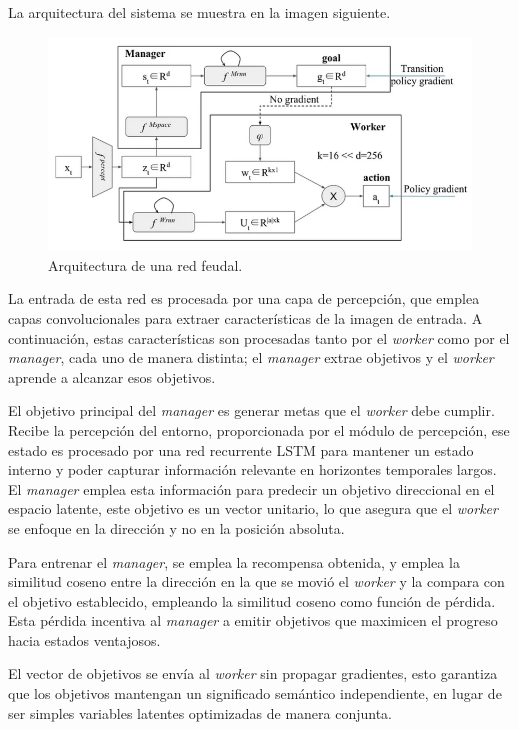 \documentclass[letterpaper]{article} %
\begin{document}
La arquitectura del sistema se muestra en la imagen siguiente\cite{feudal_networks_2024}.

\begin{figure}[H]
    \centering
    \includegraphics[width=0.9\columnwidth]{feudal_arquitecture.png}
    \caption{Arquitectura de una red feudal.\label{fig:arquitectura_feudal}}
\end{figure}

La entrada de esta red es procesada por una capa de percepción, que emplea capas convolucionales
para extraer características de la imagen de entrada. A continuación, estas características son procesadas
tanto por el \textit{worker} como por el \textit{manager}, cada uno de manera distinta; el \textit{manager} extrae objetivos y el \textit{worker}
aprende a alcanzar esos objetivos.

El objetivo principal del \textit{manager} es generar metas que el \textit{worker} debe cumplir. Recibe la percepción
del entorno, proporcionada por el módulo de percepción, ese estado es procesado por una red recurrente LSTM
para mantener un estado interno y poder capturar información relevante en horizontes temporales largos.
El \textit{manager} emplea esta información para predecir un objetivo direccional en el espacio latente, este objetivo
es un vector unitario, lo que asegura que el \textit{worker} se enfoque en la dirección y no en la posición absoluta.

Para entrenar el \textit{manager}, se emplea la recompensa obtenida, y emplea la similitud coseno entre la dirección en la que 
se movió el \textit{worker} y la compara con el objetivo establecido, empleando la similitud coseno como función de pérdida.
Esta pérdida incentiva al \textit{manager} a emitir objetivos que maximicen el progreso hacia estados ventajosos.

El vector de objetivos se envía al \textit{worker} sin propagar gradientes, esto garantiza que los objetivos 
mantengan un significado semántico independiente, en lugar de ser simples variables latentes optimizadas de manera conjunta.
\end{document}
